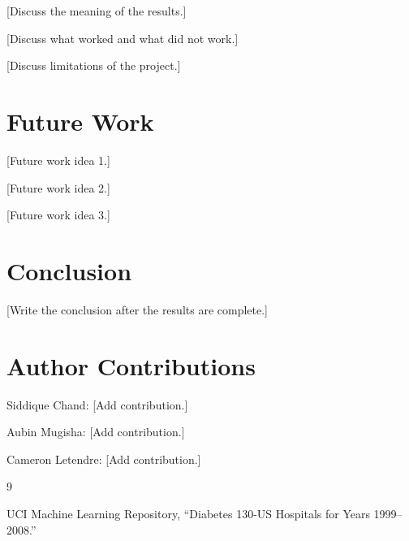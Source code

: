 \documentclass[conference]{IEEEtran}
\begin{document}
[Discuss the meaning of the results.]

[Discuss what worked and what did not work.]

[Discuss limitations of the project.]


\section{Future Work}


[Future work idea 1.]

[Future work idea 2.]

[Future work idea 3.]


\section{Conclusion}


[Write the conclusion after the results are complete.]


\section*{Author Contributions}

Siddique Chand: [Add contribution.]

Aubin Mugisha: [Add contribution.]

Cameron Letendre: [Add contribution.]


\begin{thebibliography}{9}


UCI Machine Learning Repository,
``Diabetes 130-US Hospitals for Years 1999--2008.''

\end{thebibliography}
\end{document}
